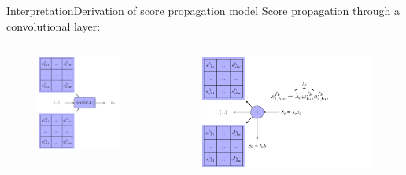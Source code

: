 \documentclass{beamer}
\begin{document}
\begin{frame}{Interpretation}{Derivation of score propagation model}
\alert{Score propagation through a convolutional layer:}
\begin{columns}
	\begin{column}{0.5\textwidth}
\begin{figure}
	\centering
		\includegraphics[scale=0.55]{./chapter_interpretation/score_conv2d.pdf}
\end{figure}
	\end{column}
	\begin{column}{0.5\textwidth}
\begin{figure}
	\centering
	\includegraphics[scale=0.55]{./chapter_interpretation/score_conv2d_score.pdf}
\end{figure}		
	\end{column}
\end{columns}
\end{frame}
\end{document}
